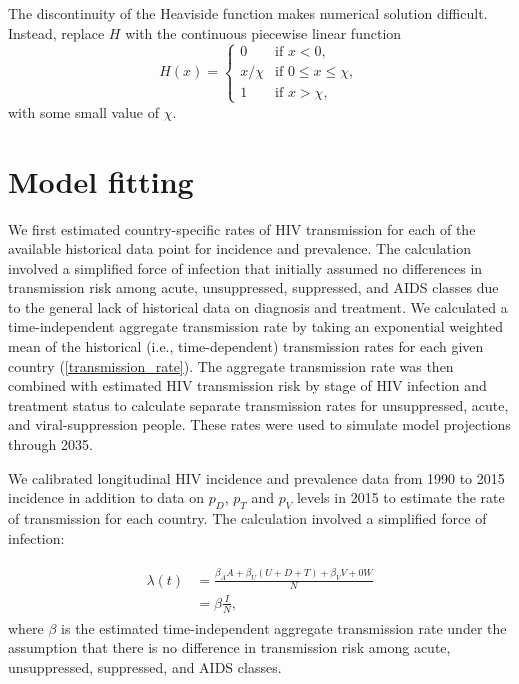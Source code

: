 \documentclass[11pt]{article}
\begin{document}
The discontinuity of the Heaviside function makes numerical solution
difficult.  Instead, replace $H$ with the continuous piecewise linear
function
\begin{equation}
  H(x) =
  \begin{cases}
    0 & \text{if $x < 0$},
    \\
    x / \chi & \text{if $0 \leq x \leq \chi$},
    \\
    1 & \text{if $x > \chi$},
  \end{cases}
\end{equation}
with some small value of $\chi$.


\section{Model fitting}
\label{model_fitting}
We first estimated country-specific rates of HIV transmission for each
of the available historical data point for incidence and
prevalence. The calculation involved a simplified force of infection
that initially assumed no differences in transmission risk among
acute, unsuppressed, suppressed, and AIDS classes due to the general
lack of historical data on diagnosis and treatment. We calculated a
time-independent aggregate transmission rate by taking an exponential
weighted mean of the historical (i.e., time-dependent) transmission
rates for each given country (\ref{transmission_rate}). The aggregate
transmission rate was then combined with estimated HIV transmission
risk by stage of HIV infection \cite{Hollingsworth2008-iy} and
treatment status \cite{Wawer2005-us} to calculate separate
transmission rates for unsuppressed, acute, and viral-suppression
people. These rates were used to simulate model projections through
2035.



{We calibrated longitudinal HIV incidence and prevalence data from
  1990 to 2015 incidence in addition to data on $p_{D}$, $p_{T}$ and
  $p_{V}$ levels in 2015 to estimate the rate of transmission for each
  country. The calculation involved a simplified force of infection:}

\begin{align}
  \label{foi}
  \begin{split}
  \lambda(t) &  =    \frac{\beta_{A} A + \beta_{U}(U+D+T)+\beta_{V}V+0
               W}{N} \\
             &  =  \beta \frac{I}{N},
             \end{split}
\end{align}
where $\beta$ is the estimated time-independent aggregate transmission rate under the
assumption that there is no difference in transmission risk among acute, unsuppressed, suppressed, and AIDS classes.
\end{document}
